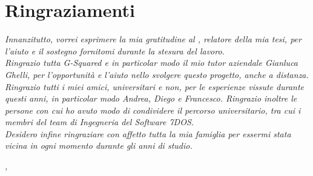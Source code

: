 
\cleardoublepage
{}
{}


\bigskip

\begingroup
\let\clearpage\relax
\let\cleardoublepage\relax
\let\cleardoublepage\relax

\chapter*{Ringraziamenti}

\noindent \textit{Innanzitutto, vorrei esprimere la mia gratitudine al \profTitle \myProf, relatore della mia tesi, per l'aiuto e il sostegno fornitomi durante la stesura del lavoro.}\\

\noindent \textit{Ringrazio tutta G-Squared e in particolar modo il mio tutor aziendale Gianluca Ghelli, per l'opportunità e l'aiuto nello svolgere questo progetto, anche a distanza.}\\

\noindent \textit{Ringrazio tutti i miei amici, universitari e non, per le esperienze vissute durante questi anni, in particolar modo Andrea, Diego e Francesco. Ringrazio inoltre le persone con cui ho avuto modo di condividere il percorso universitario, tra cui i membri del team di Ingegneria del Software 7DOS.}\\

\noindent \textit{Desidero infine ringraziare con affetto tutta la mia famiglia per essermi stata vicina in ogni momento durante gli anni di studio.}\\
\bigskip

\noindent\textit{\myLocation, \myTime}
\hfill \myName

\endgroup

